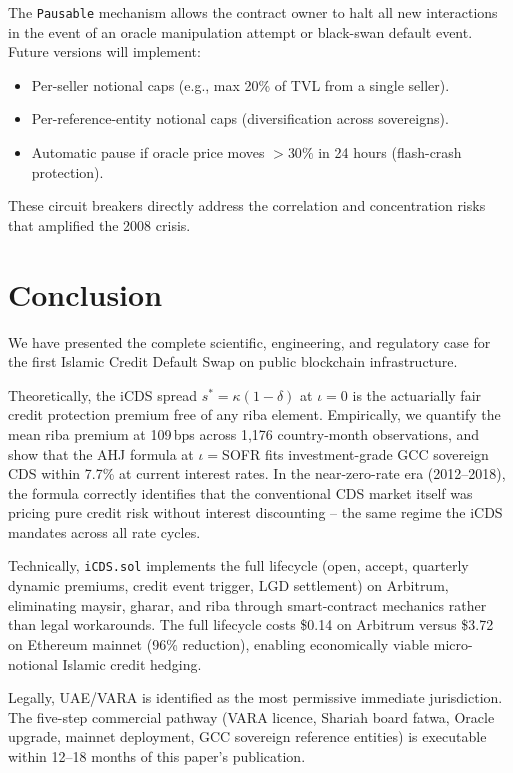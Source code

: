 \documentclass[12pt]{article}
\theoremstyle{plain}
\theoremstyle{definition}
\theoremstyle{remark}
\begin{document}
The \texttt{Pausable} mechanism allows the contract owner to halt all new
interactions in the event of an oracle manipulation attempt or black-swan
default event.
Future versions will implement:
\begin{itemize}[noitemsep]
  \item Per-seller notional caps (e.g., max 20\% of TVL from a single seller).
  \item Per-reference-entity notional caps (diversification across sovereigns).
  \item Automatic pause if oracle price moves $> 30\%$ in 24 hours
    (flash-crash protection).
\end{itemize}
These circuit breakers directly address the correlation and concentration
risks that amplified the 2008 crisis.

\section{Conclusion}
\label{sec:conclusion}

We have presented the complete scientific, engineering, and regulatory case
for the first Islamic Credit Default Swap on public blockchain infrastructure.

Theoretically, the iCDS spread $s^* = \kappa(1-\delta)$ at $\iota=0$ is
the actuarially fair credit protection premium free of any riba element.
Empirically, we quantify the mean riba premium at 109\,bps across
1,176 country-month observations, and show that the AHJ formula at
$\iota=$SOFR fits investment-grade GCC sovereign CDS within 7.7\% at
current interest rates.
In the near-zero-rate era (2012--2018), the formula correctly identifies
that the conventional CDS market itself was pricing pure credit risk without
interest discounting -- the same regime the iCDS mandates across all rate cycles.

Technically, \texttt{iCDS.sol} implements the full lifecycle (open, accept,
quarterly dynamic premiums, credit event trigger, LGD settlement) on Arbitrum,
eliminating maysir, gharar, and riba through smart-contract mechanics rather
than legal workarounds.
The full lifecycle costs \$0.14 on Arbitrum versus \$3.72 on Ethereum mainnet
(96\% reduction), enabling economically viable micro-notional Islamic credit
hedging.

Legally, UAE/VARA is identified as the most permissive immediate jurisdiction.
The five-step commercial pathway (VARA licence, Shariah board fatwa, Oracle
upgrade, mainnet deployment, GCC sovereign reference entities) is executable
within 12--18 months of this paper's publication.
\end{document}
